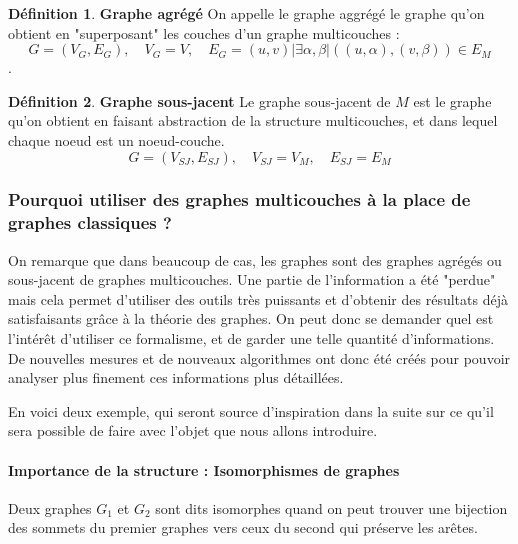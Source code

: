 \documentclass[11pt,a4paper]{article}
\theoremstyle{definition}
\newtheorem{defn}{Définition}
\theoremstyle{remark}
\theoremstyle{remark}
\begin{document}
\begin{defn}{\textbf{Graphe agrégé}}
	On appelle le graphe aggrégé le graphe qu'on obtient en "superposant" les couches d'un graphe multicouches : $$G=(V_G,E_G), \quad V_G=V, \quad E_G={(u,v)|\exists \alpha, \beta | ((u,\alpha),(v,\beta)) \in E_M}$$.
\end{defn}

\begin{defn}{\textbf{Graphe sous-jacent}}
Le graphe sous-jacent de $M$ est le graphe qu'on obtient en faisant abstraction de la structure multicouches, et dans lequel chaque noeud est un noeud-couche.
$$G=(V_{SJ},E_{SJ}), \quad V_{SJ} = V_M, \quad E_{SJ}=E_M$$
\end{defn}




\subsubsection{Pourquoi utiliser des graphes multicouches à la place de graphes classiques ?}

On remarque que dans beaucoup de cas, les graphes sont des graphes agrégés ou sous-jacent de graphes multicouches. Une partie de l'information a été "perdue" mais cela permet d'utiliser des outils très puissants et d'obtenir des résultats déjà satisfaisants grâce à la théorie des graphes. On peut donc se demander quel est l'intérêt d'utiliser ce formalisme, et de garder une telle quantité d'informations. De nouvelles mesures et de nouveaux algorithmes ont donc été créés pour pouvoir analyser plus finement ces informations plus détaillées.

En voici deux exemple, qui seront source d'inspiration dans la suite sur ce qu'il sera possible de faire avec l'objet que nous allons introduire.


\paragraph{Importance de la structure : Isomorphismes de graphes}

Deux graphes $G_1$ et $G_2$ sont dits isomorphes quand on peut trouver une bijection des sommets du premier graphes vers ceux du second qui préserve les arêtes.
\end{document}
